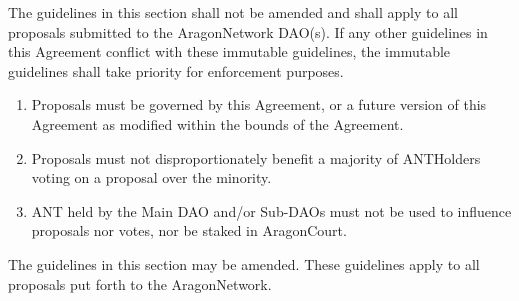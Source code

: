 
\label{chap:ANDAOAgreement}

\begin{enumerate}
	\label{sec:ImmutableGuidelines}
	The guidelines in this section shall not be amended and shall apply to all proposals submitted to the \gls{AragonNetwork} \ac{DAO}(s). 
	If any other guidelines in this Agreement conflict with these immutable guidelines, the immutable guidelines shall take priority for enforcement purposes.
	\begin{enumerate}
		
		
		\begin{enumerate}
			\item Proposals must be governed by this Agreement, or a future version of this Agreement as modified within the bounds of the Agreement.
			\item Proposals must not disproportionately benefit a majority of \glspl{ANTHolder} voting on a proposal over the minority.
			\item \ac{ANT} held by the Main \ac{DAO} and/or Sub-\acp{DAO} must not be used to influence proposals nor votes, nor be staked in \gls{AragonCourt}.
		\end{enumerate}
	\end{enumerate}

	\label{sec:MutableGuidelines}
	The guidelines in this section may be amended. These guidelines apply to all proposals put forth to the \gls{AragonNetwork}.
	
	\begin{enumerate}
		

\end{enumerate}
\end{enumerate}
